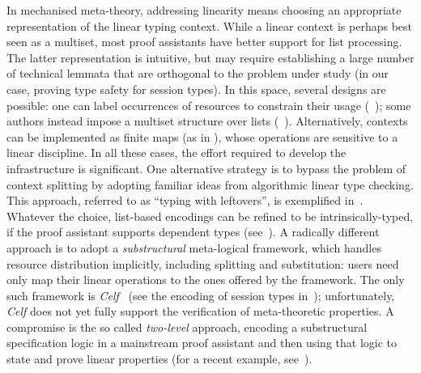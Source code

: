 \documentclass[runningheads]{llncs}
\begin{document}
In mechanised meta-theory, addressing linearity means choosing an appropriate
representation of the linear typing context.  While a linear context is perhaps
best seen as a multiset, most proof assistants have better support for list
processing.  The latter representation is intuitive, but may require
establishing a large number of technical lemmata that are orthogonal to the
problem under study (in our case, proving type safety for
session types).  In this space, several designs are possible: one can label
occurrences of resources to constrain their usage (\eg~\cite{CicconeP20}); some
authors instead impose a multiset structure over lists
(\eg~\cite{Danielsson12,ChaudhuriLR19}). Alternatively, contexts can be
implemented as finite maps (as in \cite{Castro2020}), whose operations are
sensitive to a linear discipline. In all these cases, the effort required to
develop the infrastructure is significant.
%
One alternative strategy is to bypass the problem of context splitting
by adopting familiar ideas from algorithmic linear type checking. This
approach, referred to as ``typing with leftovers'', is exemplified
in~\cite{DBLP:conf/forte/ZalakainD21}.  Whatever the choice,
list-based encodings can be refined to be intrinsically-typed, if the
proof assistant supports dependent types
(see~\cite{Thiemann2019,CicconeP20,RouvoetPKV20}).
%
A radically different approach is to adopt a \emph{substructural}
meta-logical framework, which handles resource
distribution implicitly, including splitting and
substitution: users need only map their linear operations to the
ones offered by the framework.  The only such framework is
\emph{Celf}~\cite{Schack-Nielsen:IJCAR08} (see the encoding of session
types in~\cite{Bock2016}); unfortunately, \emph{Celf} does not yet
fully support the verification of meta-theoretic properties.  A
compromise is the so called \emph{two-level} approach, \ie encoding a
substructural specification logic in a mainstream proof assistant and
then using that logic to state and prove linear properties (for a
recent example, see~\cite{Felty:MSCS21}).
\end{document}
